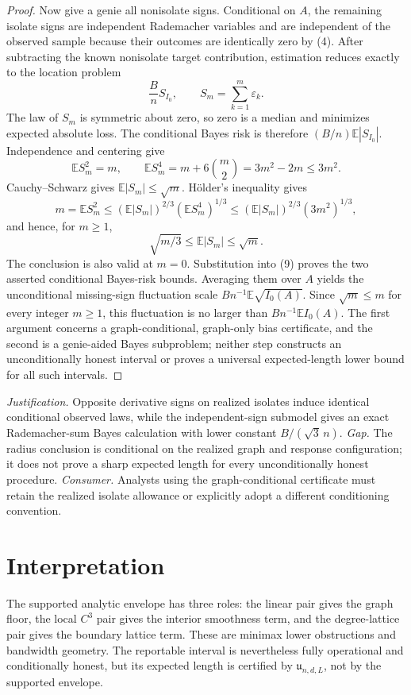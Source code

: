 \documentclass{article}
\begin{document}
\begin{proof}
Now give a genie all nonisolate signs.  Conditional on \(A\), the remaining isolate signs are independent Rademacher variables and are independent of the observed sample because their outcomes are identically zero by (4).  After subtracting the known nonisolate target contribution, estimation reduces exactly to the location problem
\[
 \frac BnS_{I_0},\qquad S_m=\sum_{k=1}^m\varepsilon_k.
\tag{9}
\]
The law of \(S_m\) is symmetric about zero, so zero is a median and minimizes expected absolute loss.  The conditional Bayes risk is therefore \((B/n)\mathbb E|S_{I_0}|\).  Independence and centering give
\[
 \mathbb ES_m^2=m,\qquad
 \mathbb ES_m^4=m+6\binom m2=3m^2-2m\leq3m^2.
\tag{10}
\]
Cauchy--Schwarz gives \(\mathbb E|S_m|\leq\sqrt m\).  Hölder's inequality gives
\[
 m=\mathbb ES_m^2
 \leq(\mathbb E|S_m|)^{2/3}(\mathbb ES_m^4)^{1/3}
 \leq(\mathbb E|S_m|)^{2/3}(3m^2)^{1/3},
\]
and hence, for \(m\geq1\),
\[
 \sqrt{m/3}\leq\mathbb E|S_m|\leq\sqrt m.
\tag{11}
\]
The conclusion is also valid at \(m=0\).  Substitution into (9) proves the two asserted conditional Bayes-risk bounds.  Averaging them over \(A\) yields the unconditional missing-sign fluctuation scale \(Bn^{-1}\mathbb E\sqrt{I_0(A)}\).  Since \(\sqrt m\leq m\) for every integer \(m\geq1\), this fluctuation is no larger than \(Bn^{-1}\mathbb EI_0(A)\).  The first argument concerns a graph-conditional, graph-only bias certificate, and the second is a genie-aided Bayes subproblem; neither step constructs an unconditionally honest interval or proves a universal expected-length lower bound for all such intervals.
\end{proof}
\par\smallskip\noindent \textit{Justification.} Opposite derivative signs on realized isolates induce identical conditional observed laws, while the independent-sign submodel gives an exact Rademacher-sum Bayes calculation with lower constant \(B/(\sqrt3\,n)\). \textit{Gap.} The radius conclusion is conditional on the realized graph and response configuration; it does not prove a sharp expected length for every unconditionally honest procedure. \textit{Consumer.} Analysts using the graph-conditional certificate must retain the realized isolate allowance or explicitly adopt a different conditioning convention.

\section{Interpretation}

The supported analytic envelope has three roles: the linear pair gives the graph floor, the local \(C^3\) pair gives the interior smoothness term, and the degree-lattice pair gives the boundary lattice term.  These are minimax lower obstructions and bandwidth geometry.  The reportable interval is nevertheless fully operational and conditionally honest, but its expected length is certified by \(\mathfrak u_{n,d,L}\), not by the supported envelope.
\end{document}
